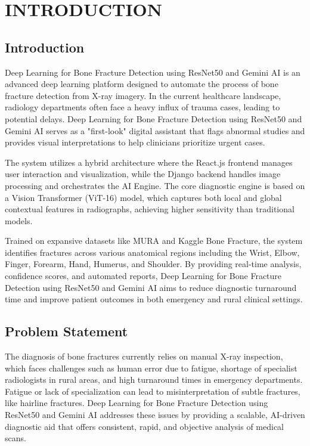 \documentclass[a4paper,12pt]{report}
\begin{document}
    \chapter{\LARGE INTRODUCTION}   %
    \justifying
    \setlength{\parskip}{0pt}
    \setlength{\parindent}{1.5em}


    \section{Introduction}
    \noindent Deep Learning for Bone Fracture Detection using ResNet50 and Gemini AI is an advanced deep learning platform designed to automate the process of bone fracture detection from X-ray imagery. In the current healthcare landscape, radiology departments often face a heavy influx of trauma cases, leading to potential delays. Deep Learning for Bone Fracture Detection using ResNet50 and Gemini AI serves as a "first-look" digital assistant that flags abnormal studies and provides visual interpretations to help clinicians prioritize urgent cases.

    \noindent The system utilizes a hybrid architecture where the React.js frontend manages user interaction and visualization, while the Django backend handles image processing and orchestrates the AI Engine. The core diagnostic engine is based on a Vision Transformer (ViT-16) model, which captures both local and global contextual features in radiographs, achieving higher sensitivity than traditional models.

    \noindent Trained on expansive datasets like MURA and Kaggle Bone Fracture, the system identifies fractures across various anatomical regions including the Wrist, Elbow, Finger, Forearm, Hand, Humerus, and Shoulder. By providing real-time analysis, confidence scores, and automated reports, Deep Learning for Bone Fracture Detection using ResNet50 and Gemini AI aims to reduce diagnostic turnaround time and improve patient outcomes in both emergency and rural clinical settings.

    \section{Problem Statement}
    The diagnosis of bone fractures currently relies on manual X-ray inspection, which faces challenges such as human error due to fatigue, shortage of specialist radiologists in rural areas, and high turnaround times in emergency departments. Fatigue or lack of specialization can lead to misinterpretation of subtle fractures, like hairline fractures. Deep Learning for Bone Fracture Detection using ResNet50 and Gemini AI addresses these issues by providing a scalable, AI-driven diagnostic aid that offers consistent, rapid, and objective analysis of medical scans.
\end{document}
